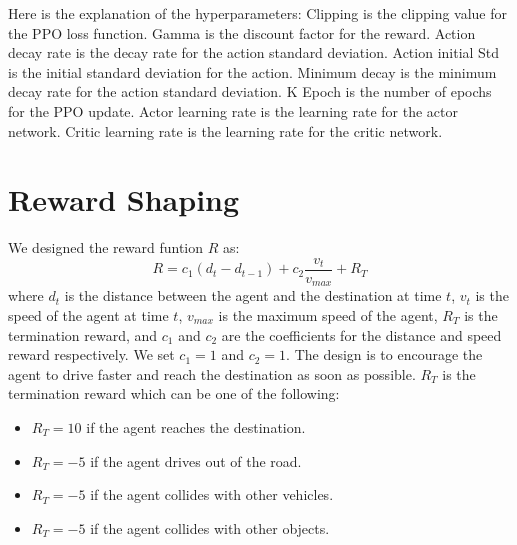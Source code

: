 Here is the explanation of the hyperparameters: Clipping is the clipping value for the PPO loss function.
Gamma is the discount factor for the reward.
Action decay rate is the decay rate for the action standard deviation.
Action initial Std is the initial standard deviation for the action.
Minimum decay is the minimum decay rate for the action standard deviation.
K Epoch is the number of epochs for the PPO update.
Actor learning rate is the learning rate for the actor network.
Critic learning rate is the learning rate for the critic network.
\pagebreak
\section{Reward Shaping}\label{sec:reward-shaping}
We designed the reward funtion $R$ as:
\begin{equation}
    R = c_{1}(d_{t} - d_{t-1}) + c_{2}\frac{v_{t}}{v_{max}} + R_{T}
\end{equation}
where $d_{t}$ is the distance between the agent and the destination at time $t$, $v_{t}$ is the speed of the agent at time $t$, $v_{max}$ is the maximum speed of the agent, $R_{T}$ is the termination reward, and $c_{1}$ and $c_{2}$ are the coefficients for the distance and speed reward respectively.
We set $c_{1} = 1$ and $c_{2} = 1$.
The design is to encourage the agent to drive faster and reach the destination as soon as possible.
$R_{T}$ is the termination reward which can be one of the following:
\begin{itemize}
    \item $R_{T} = 10$ if the agent reaches the destination.
    \item $R_{T} = -5$ if the agent drives out of the road.
    \item $R_{T} = -5$ if the agent collides with other vehicles.
    \item $R_{T} = -5$ if the agent collides with other objects.
\end{itemize}


